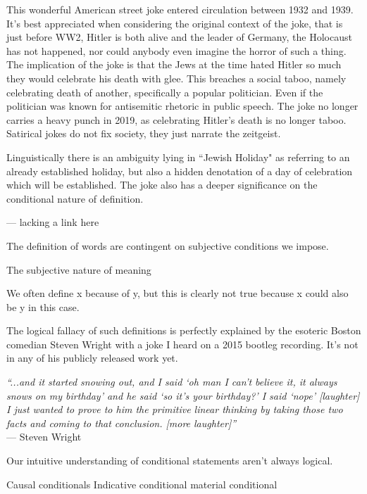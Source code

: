 This wonderful American street joke entered circulation between 1932 and 1939. It's best appreciated when considering the original context of the joke, that is just before WW2, Hitler is both alive and the leader of Germany, the Holocaust has not happened, nor could anybody even imagine the horror of such a thing. The implication of the joke is that the Jews at the time hated Hitler so much they would celebrate his death with glee. This breaches a social taboo, namely celebrating death of another, specifically a popular politician. Even if the politician was known for antisemitic rhetoric in public speech. The joke no longer carries a heavy punch in 2019, as celebrating Hitler's death is no longer taboo. Satirical jokes do not fix society, they just narrate the zeitgeist.

Linguistically there is an ambiguity lying in ``Jewish Holiday" as referring to an already established holiday, but also a hidden denotation of a day of celebration which will be established. The joke also has a deeper significance on the conditional nature of definition. 

--- lacking a link here


The definition of words are contingent on subjective conditions we impose.


The subjective nature of meaning

We often define x because of y, but this is clearly not true because x could also be y in this case.

The logical fallacy of such definitions is perfectly explained by the esoteric Boston comedian Steven Wright with a joke I heard on a 2015 bootleg recording. It's not in any of his publicly released work yet.

\begin{center}
\textit{
``...and it started snowing out, and I said `oh man I can't believe it, it always snows on my birthday' and he said `so it's your birthday?' I said `nope' [laughter] I just wanted to prove to him the primitive linear thinking by taking those two facts and coming to that conclusion. [more laughter]''} \\ --- Steven Wright
\end{center}

Our intuitive understanding of conditional statements aren't always logical.

Causal conditionals
Indicative conditional
material conditional

